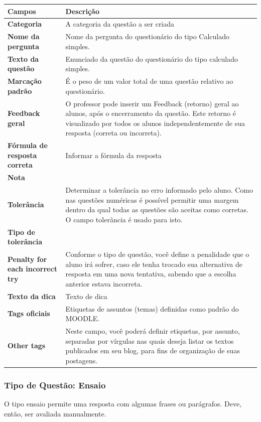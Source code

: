 \begin{longtable}{p{6cm}|p{9cm}}
     \hline
     \rowcolor[rgb]{0.8,0.8,0.8} \textbf{Campos} &  \textbf{Descrição}\\\hline
 \textbf{Categoria} & A categoria da questão a ser criada  \\\hline
    \textbf{Nome da pergunta} & Nome da pergunta do questionário do tipo Calculado simples.\\\hline
    \textbf{Texto da questão} & Enunciado da questão do questionário do tipo calculado simples.  \\\hline
    \textbf{Marcação padrão} & É o peso de um valor total de uma questão relativo ao questionário.  \\\hline
    \textbf{Feedback geral} & O professor pode inserir um Feedback (retorno)  geral  ao alunos,  após o encerramento da questão. Este retorno é visualizado por todos os alunos independentemente de sua resposta (correta ou incorreta).\\\hline
    \textbf{Fórmula de resposta correta} & Informar a fórmula da resposta \\\hline
    \textbf{Nota} &         \\\hline
    \textbf{Tolerância} & Determinar a tolerância no erro informado pelo aluno. Como nas questões numéricas é possível permitir uma margem dentro da qual todas as questões são aceitas como corretas. O campo tolerância é usado para isto. \\\hline
    \textbf{Tipo de tolerância} &         \\\hline
    \textbf{Penalty for each incorrect try} & Conforme o tipo de questão, você define a  penalidade que o aluno irá sofrer, caso ele tenha trocado sua  alternativa de resposta em uma nova tentativa, sabendo que a escolha anterior estava incorreta.   \\\hline
    \textbf{Texto da dica} & Texto de dica \\\hline
    \textbf{Tags oficiais} & Etiquetas de assuntos (temas) definidas como padrão do MOODLE. \\\hline
    \textbf{Other tags} & Neste campo,  você poderá definir  etiquetas,  por assunto, separadas por vírgulas nas quais deseja listar os textos publicados em seu blog, para fins de organização de suas postagens. \\\hline
\end{longtable}%

\subsubsection{Tipo de Questão: Ensaio}
O tipo ensaio permite uma resposta com algumas frases ou parágrafos. Deve, então, ser avaliada manualmente.


